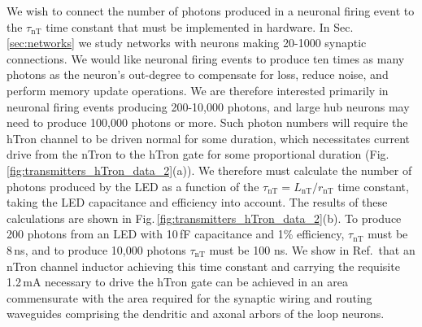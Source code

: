 \documentclass[twocolumn]{article}
\newcommand{\onlinecite}[1]{\hspace{-1 ex} \nocite{#1}\citenum{#1}}
\begin{document}
We wish to connect the number of photons produced in a neuronal firing event to the $\tau_{\mathrm{nT}}$ time constant that must be implemented in hardware. In Sec.\,\ref{sec:networks} we study networks with neurons making 20-1000 synaptic connections. We would like neuronal firing events to produce ten times as many photons as the neuron's out-degree to compensate for loss, reduce noise, and perform memory update operations. We are therefore interested primarily in neuronal firing events producing 200-10,000 photons, and large hub neurons may need to produce 100,000 photons or more. Such photon numbers will require the hTron channel to be driven normal for some duration, which necessitates current drive from the nTron to the hTron gate for some proportional duration (Fig.\,\ref{fig:transmitters_hTron_data_2}(a)). We therefore must calculate the number of photons produced by the LED as a function of the $\tau_{\mathrm{nT}} = L_{\mathrm{nT}}/r_{\mathrm{nT}}$ time constant, taking the LED capacitance and efficiency into account. The results of these calculations are shown in Fig.\,\ref{fig:transmitters_hTron_data_2}(b). To produce 200 photons from an LED with 10\,fF capacitance and 1\% efficiency, $\tau_{\mathrm{nT}}$ must be 8\,ns, and to produce 10,000 photons $\tau_{\mathrm{nT}}$ must be 100 ns. We show in Ref.\,\onlinecite{sh2018d} that an nTron channel inductor achieving this time constant and carrying the requisite 1.2\,mA necessary to drive the hTron gate can be achieved in an area commensurate with the area required for the synaptic wiring and routing waveguides comprising the dendritic and axonal arbors of the loop neurons. 
\end{document}
